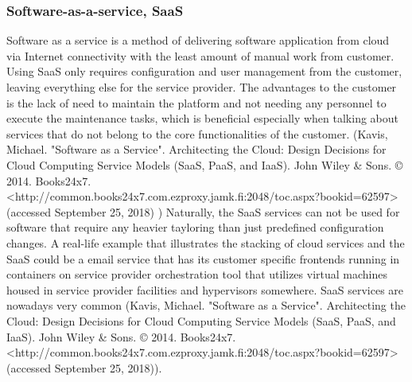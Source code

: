 \documentclass{article}
\begin{document}
\subsubsection{Software-as-a-service, SaaS}
Software as a service is a method of delivering software application from cloud via Internet connectivity with the least amount of manual work from customer. Using SaaS only requires configuration and user management from the customer, leaving everything else for the service provider. The advantages to the customer is the lack of need to maintain the platform and not needing any personnel to execute the maintenance tasks, which is beneficial especially when talking about services that do not belong to the core functionalities of the customer. (Kavis, Michael. "Software as a Service". Architecting the Cloud: Design Decisions for Cloud Computing Service Models (SaaS, PaaS, and IaaS). John Wiley & Sons. © 2014. Books24x7. <http://common.books24x7.com.ezproxy.jamk.fi:2048/toc.aspx?bookid=62597> (accessed September 25, 2018) ) Naturally, the SaaS services can not be used for software that require any heavier tayloring than just predefined configuration changes.
A real-life example that illustrates the stacking of cloud services and the SaaS could be a email service that has its customer specific frontends running in containers on service provider orchestration tool that utilizes virtual machines housed in service provider facilities and hypervisors somewhere. SaaS services are nowadays very common (Kavis, Michael. "Software as a Service". Architecting the Cloud: Design Decisions for Cloud Computing Service Models (SaaS, PaaS, and IaaS). John Wiley & Sons. © 2014. Books24x7. <http://common.books24x7.com.ezproxy.jamk.fi:2048/toc.aspx?bookid=62597> (accessed September 25, 2018)).
\end{document}
